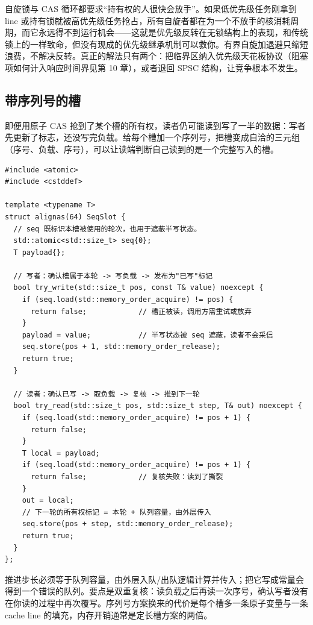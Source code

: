 \documentclass[12pt,a4paper,fontset=fandol]{ctexbook}
\begin{document}
\begin{warning}[title={CAS 自旋与自旋锁上的优先级反转}]
自旋锁与 CAS 循环都要求“持有权的人很快会放手”。如果低优先级任务刚拿到 line 或持有锁就被高优先级任务抢占，所有自旋者都在为一个不放手的核消耗周期，而它永远得不到运行机会——这就是优先级反转在无锁结构上的表现，和传统锁上的一样致命，但没有现成的优先级继承机制可以救你。有界自旋加退避只缩短浪费，不解决反转。真正的解法只有两个：把临界区纳入优先级天花板协议（阻塞项如何计入响应时间界见第 10 章），或者退回 SPSC 结构，让竞争根本不发生。
\end{warning}

\subsection*{带序列号的槽}

即便用原子 CAS 抢到了某个槽的所有权，读者仍可能读到写了一半的数据：写者先更新了标志，还没写完负载。给每个槽加一个序列号，把槽变成自洽的三元组（序号、负载、序号），可以让读端判断自己读到的是一个完整写入的槽。

\begin{lstlisting}[style=cppstyle,caption={C++：带序列号的 MPMC 槽（有界队列的单元）},label={lst:ch09-seq-slot}]
#include <atomic>
#include <cstddef>

template <typename T>
struct alignas(64) SeqSlot {
  // seq 既标识本槽被使用的轮次，也用于遮蔽半写状态。
  std::atomic<std::size_t> seq{0};
  T payload{};

  // 写者：确认槽属于本轮 -> 写负载 -> 发布为"已写"标记
  bool try_write(std::size_t pos, const T& value) noexcept {
    if (seq.load(std::memory_order_acquire) != pos) {
      return false;            // 槽正被读，调用方需重试或放弃
    }
    payload = value;           // 半写状态被 seq 遮蔽，读者不会采信
    seq.store(pos + 1, std::memory_order_release);
    return true;
  }

  // 读者：确认已写 -> 取负载 -> 复核 -> 推到下一轮
  bool try_read(std::size_t pos, std::size_t step, T& out) noexcept {
    if (seq.load(std::memory_order_acquire) != pos + 1) {
      return false;
    }
    T local = payload;
    if (seq.load(std::memory_order_acquire) != pos + 1) {
      return false;            // 复核失败：读到了撕裂
    }
    out = local;
    // 下一轮的所有权标记 = 本轮 + 队列容量，由外层传入
    seq.store(pos + step, std::memory_order_release);
    return true;
  }
};
\end{lstlisting}

推进步长必须等于队列容量，由外层入队/出队逻辑计算并传入；把它写成常量会得到一个错误的队列。要点是双重复核：读负载之后再读一次序号，确认写者没有在你读的过程中再次覆写。序列号方案换来的代价是每个槽多一条原子变量与一条 cache line 的填充，内存开销通常是定长槽方案的两倍。
\end{document}
